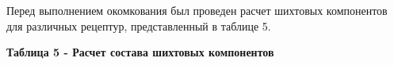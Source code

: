Перед выполнением окомкования был проведен расчет шихтовых компонентов
для различных рецептур, представленный в таблице 5.

{\bfseries Таблица 5 - Расчет состава шихтовых компонентов}

